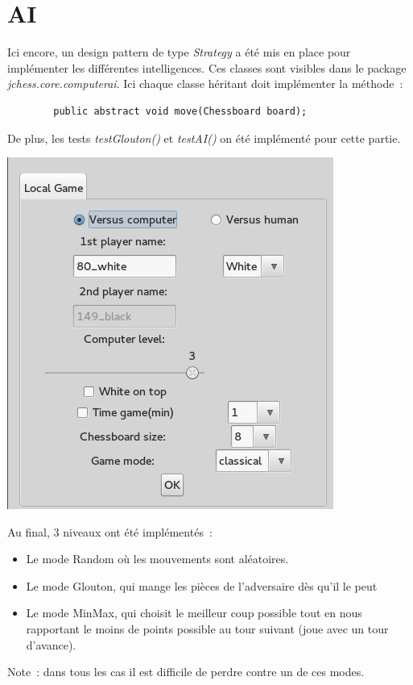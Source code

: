 \documentclass{article}
\begin{document}
	\section{AI}
	\label{sec:AI}
	Ici encore, un design pattern de type \emph{Strategy} a été mis en place pour implémenter les différentes intelligences. Ces classes sont visibles dans le package \emph{jchess.core.computerai}. Ici chaque classe héritant doit implémenter la méthode~:
	\begin{verbatim}
		public abstract void move(Chessboard board);
	\end{verbatim}
	De plus, les tests \emph{testGlouton()} et \emph{testAI()} on été implémenté pour cette partie.
	\begin{center}
		\includegraphics[scale=0.5]{img/AI}
		\label{AI}
	\end{center}
	Au final, 3 niveaux ont été implémentés~:
	\begin{itemize}
		\item Le mode Random où les mouvements sont aléatoires.
		\item Le mode Glouton, qui mange les pièces de l'adversaire dès qu'il le peut
		\item Le mode MinMax, qui choisit le meilleur coup possible tout en nous rapportant le moins de points possible au tour suivant (joue avec un tour d'avance).
	\end{itemize}
	Note~: dans tous les cas il est difficile de perdre contre un de ces modes.
\end{document}
